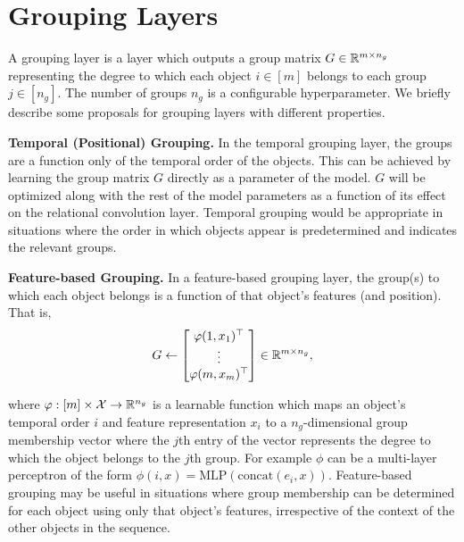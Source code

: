 \section{Grouping Layers}\label{sec:grouping_layers}

A grouping layer is a layer which outputs a group matrix $G \in \mathbb{R}^{m \times n_g}$ representing the degree to which each object $i \in [m]$ belongs to each group $j \in [n_g]$. The number of groups $n_g$ is a configurable hyperparameter. We briefly describe some proposals for grouping layers with different properties.

\textbf{Temporal (Positional) Grouping.} In the temporal grouping layer, the groups are a function only of the temporal order of the objects. This can be achieved by learning the group matrix $G$ directly as a parameter of the model. $G$ will be optimized along with the rest of the model parameters as a function of its effect on the relational convolution layer. Temporal grouping would be appropriate in situations where the order in which objects appear is predetermined and indicates the relevant groups.

\textbf{Feature-based Grouping.} In a feature-based grouping layer, the group(s) to which each object belongs is a function of that object's features (and position). That is,
\begin{equation}
        G \gets \begin{bmatrix}
            \varphi(1, x_1)^\top \\
            \vdots \\
            \varphi(m, x_m)^\top
        \end{bmatrix} \in \mathbb{R}^{m \times n_g},
\end{equation}

\noindent where $\varphi: [m] \times {\mathcal{X}} \to \mathbb{R}^{n_g}$ is a learnable function which maps an object's temporal order $i$ and feature representation $x_i$ to a $n_g$-dimensional group membership vector where the $j$th entry of the vector represents the degree to which the object belongs to the $j$th group. For example $\phi$ can be a multi-layer perceptron of the form $\phi(i, x) = \mathrm{MLP}(\mathrm{concat}(e_i, x))$. Feature-based grouping may be useful in situations where group membership can be determined for each object using only that object's features, irrespective of the context of the other objects in the sequence.

